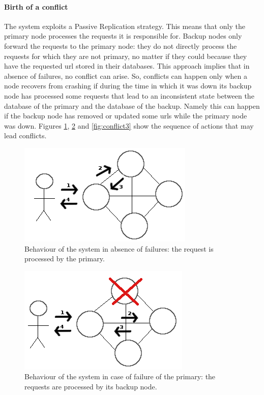 \documentclass{article}
\begin{document}
\paragraph{Birth of a conflict} The system exploits a Passive Replication strategy. This means that only the primary node processes the requests it is responsible for. Backup nodes only forward the requests to the primary node: they do not directly process the requests for which they are not primary, no matter if they could because they have the requested url stored in their databases. This approach implies that in absence of failures, no conflict can arise. So, conflicts can happen only when a node recovers from crashing if during the time in which it was down its backup node has processed some requests that lead to an inconsistent state between the database of the primary and the database of the backup. Namely this can happen if the backup node has removed or updated some urls while the primary node was down. Figures \ref{fig:conflict1}, \ref{fig:conflict2} and \ref{fig:conflict3} show the sequence of actions that may lead conflicts. 

\begin{figure}[H]
\centering
\includegraphics[scale=0.45]{conflict1}
\caption{Behaviour of the system in absence of failures: the request is processed by the primary.}
\label{fig:conflict1}
\end{figure}

\begin{figure}[H]
\centering
\includegraphics[scale=0.45]{conflict2}
\caption{Behaviour of the system in case of failure of the primary: the requests are processed by its backup node.}
\label{fig:conflict2}
\end{figure}
\end{document}
